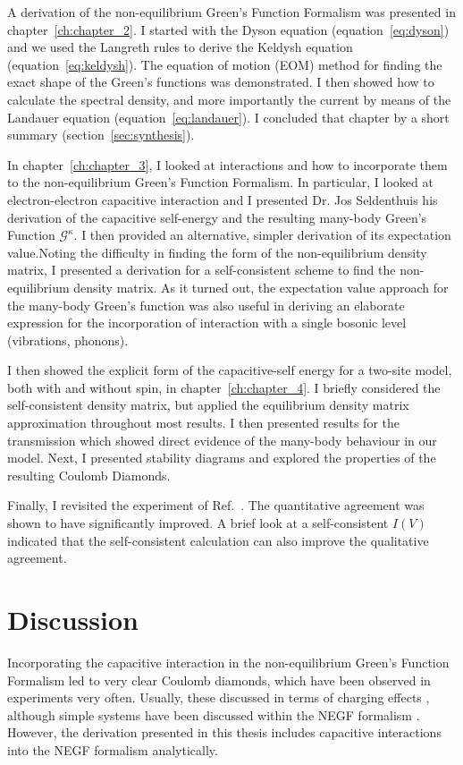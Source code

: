 A derivation of the non-equilibrium Green's Function Formalism was presented in chapter~\ref{ch:chapter_2}. I started with the Dyson equation (equation~\ref{eq:dyson}) and we used the Langreth rules to derive the Keldysh equation (equation~\ref{eq:keldysh}). The equation of motion (EOM) method for finding the exact shape of the Green's functions was demonstrated. I then showed how to calculate the spectral density, and more importantly the current by means of the Landauer equation (equation~\ref{eq:landauer}). I concluded that chapter by a short summary (section~\ref{sec:synthesis}).

In chapter~\ref{ch:chapter_3}, I looked at interactions and how to incorporate them to the non\hyp{}equilibrium Green's Function Formalism. In particular, I looked at electron-electron capacitive interaction and I presented Dr. Jos Seldenthuis his derivation of the capacitive self-energy and the resulting many-body Green's Function $\mathscr{G}^\kappa$. I then provided an alternative, simpler derivation of its expectation value.Noting the difficulty in finding the form of the non-equilibrium density matrix, I presented a derivation for a self-consistent scheme to find the non-equilibrium density matrix. As it turned out, the expectation value approach for the many-body Green's function was also useful in deriving an elaborate expression for the incorporation of interaction with a single bosonic level (vibrations, phonons). 

I then showed the explicit form of the capacitive-self energy for a two-site model, both with and without spin, in chapter~\ref{ch:chapter_4}. I briefly considered the self-consistent density matrix, but applied the equilibrium density matrix approximation throughout most results. I then presented results for the transmission which showed direct evidence of the many-body behaviour in our model. Next, I presented stability diagrams and explored the properties of the resulting Coulomb Diamonds. 

Finally, I revisited the experiment of Ref.~\cite{perrinnano}. The quantitative agreement was shown to have significantly improved. A brief look at a self-consistent $I(V)$ indicated that the self-consistent calculation can also improve the qualitative agreement.

\section{Discussion}
\label{sec:discussion}
Incorporating the capacitive interaction in the non-equilibrium Green's Function Formalism led to very clear Coulomb diamonds, which have been observed in experiments very often. Usually, these discussed in terms of charging effects \cite{seldenthuis, thijszantrev}, although simple systems have been discussed within the NEGF formalism \cite{haugjauho}. However, the derivation presented in this thesis includes capacitive interactions into the NEGF formalism analytically.

